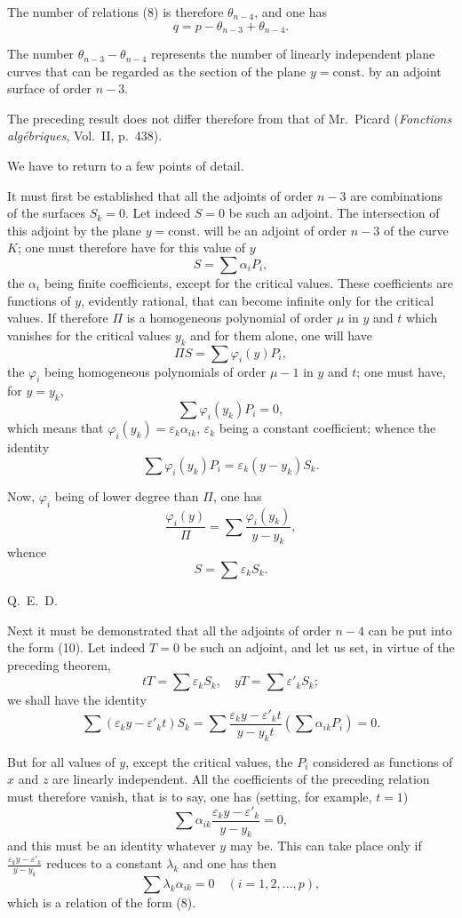 \documentclass{article}
\begin{document}
The number of relations (8) is therefore $\theta_{n-4}$, and one has
\[
q = p - \theta_{n-3} + \theta_{n-4}.
\]

The number $\theta_{n-3} - \theta_{n-4}$ represents the number of linearly independent plane curves that can be regarded as the section of the plane $y = \mathrm{const.}$ by an adjoint surface of order $n - 3$.

The preceding result does not differ therefore from that of Mr.~Picard (\emph{Fonctions algébriques}, Vol.~II, p.~438).

We have to return to a few points of detail.

It must first be established that all the adjoints of order $n - 3$ are combinations of the surfaces $S_{k} = 0$. Let indeed $S = 0$ be such an adjoint. The intersection of this adjoint by the plane $y = \mathrm{const.}$ will be an adjoint of order $n - 3$ of the curve $K$; one must therefore have for this value of $y$
\[
S = \sum \alpha_{i} P_{i},
\]
the $\alpha_{i}$ being finite coefficients, except for the critical values. These
coefficients are functions of $y$, evidently rational, that can become infinite only for the critical values. If therefore $\Pi$ is a homogeneous polynomial of order $\mu$ in $y$ and $t$ which vanishes for the critical values $y_{k}$ and for them alone, one will have
\[
\Pi S = \sum \varphi_{i}(y) P_{i},
\]
the $\varphi_{i}$ being homogeneous polynomials of order $\mu - 1$ in $y$ and $t$; one must have, for $y = y_{k}$,
\[
\sum \varphi_{i}(y_{k}) P_{i} = 0,
\]
which means that $\varphi_{i}(y_{k}) = \varepsilon_{k}\alpha_{ik}$, $\varepsilon_{k}$ being a constant coefficient; whence the identity
\[
\sum \varphi_{i}(y_{k}) P_{i} = \varepsilon_{k}(y - y_{k}) S_{k}.
\]

Now, $\varphi_{i}$ being of lower degree than $\Pi$, one has
\[
\frac{\varphi_{i}(y)}{\Pi} = \sum \frac{\varphi_{i}(y_{k})}{y - y_{k}},
\]
whence
\[
S = \sum \varepsilon_{k} S_{k}.
\]

Q.~E.~D.

Next it must be demonstrated that all the adjoints of order $n - 4$ can be put into the form (10). Let indeed $T = 0$ be such an adjoint, and let us set, in virtue of the preceding theorem,
\[
tT = \sum \varepsilon_{k} S_{k}, \quad yT = \sum \varepsilon'_{k} S_{k};
\]
we shall have the identity
\[
\sum (\varepsilon_{k}y - \varepsilon'_{k}t) S_{k} = \sum \frac{\varepsilon_{k}y - \varepsilon'_{k}t}{y - y_{k}t}\left(\sum \alpha_{ik} P_{i}\right) = 0.
\]

But for all values of $y$, except the critical values, the $P_{i}$ considered as functions of $x$ and $z$ are linearly independent.
All the coefficients of the preceding relation must therefore vanish, that is to say, one has (setting, for example, $t = 1$)
\[
\sum \alpha_{ik}\frac{\varepsilon_{k}y - \varepsilon'_{k}}{y - y_{k}} = 0,
\]
and this must be an identity whatever $y$ may be. This can take place only if $\frac{\varepsilon_{k}y - \varepsilon'_{k}}{y - y_{k}}$ reduces to a constant $\lambda_{k}$ and one has then
\[
\sum \lambda_{k}\alpha_{ik} = 0 \quad (i = 1, 2, \ldots, p),
\]
which is a relation of the form (8).
\end{document}
